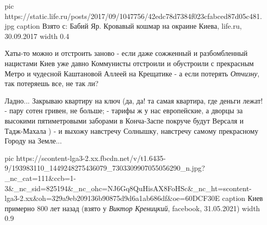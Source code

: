 \ifcmt
  pic https://static.life.ru/posts/2017/09/1047756/42edc78d7384f023cfabced87d05c481.jpg
  caption Взято с: Бабий Яр. Кровавый кошмар на окраине Киева, life.ru, 30.09.2017
  width 0.4
\fi

Хаты-то можно и отстроить заново - если даже сожженный и разбомбленный
нацистами Киев уже давно Коммунисты отстроили и обустроили с прекрасным Метро и
чудесной Каштановой Аллеей на Крещатике - а если потерять \emph{Отчизну}, так
потеряешь все, не так ли?

Ладно... Закрываю квартиру на ключ (да, да! та самая квартира, где деньги
лежат! - пару сотен гривен, не больше; - тарифы ж у нас европейские, а дворцы
за высокими пятиметровыми заборами в Конча-Заспе покруче будут Версаля и
Тадж-Махала ) - и выхожу навстречу Солнышку, навстречу самому прекрасному
Городу на Земле... 

\ifcmt
  pic https://scontent-lga3-2.xx.fbcdn.net/v/t1.6435-9/193983110_1449248275436079_7303309907055056290_n.jpg?_nc_cat=111&ccb=1-3&_nc_sid=825194&_nc_ohc=NJ6Gq8QuHisAX8FoHSc&_nc_ht=scontent-lga3-2.xx&oh=329a9eb209136b90875d9d6a1ab686df&oe=60DCF30E
  caption Киев примерно 800 лет назад (взято у \emph{Виктор Креницкий}, facebook, 31.05.2021)
  width 0.9
\fi

